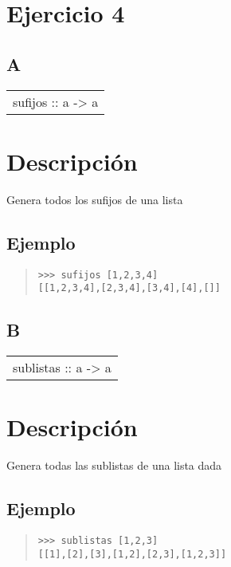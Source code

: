 \section{Ejercicio 4}
\subsection{A}
\begin{haddockdesc}
\item[\begin{tabular}{@{}l}
sufijos :: {\char 91}a{\char 93} -> {\char 91}{\char 91}a{\char 93}{\char 93}
\end{tabular}]
{\haddockbegindoc
\section*{Descripción}
Genera todos los sufijos de una lista\par
\subsection*{Ejemplo}
\begin{quote}
{\haddockverb\begin{verbatim}
>>> sufijos [1,2,3,4]
[[1,2,3,4],[2,3,4],[3,4],[4],[]]

\end{verbatim}}
\end{quote}}
\end{haddockdesc}
\subsection{B}
\begin{haddockdesc}
\item[\begin{tabular}{@{}l}
sublistas :: {\char 91}a{\char 93} -> {\char 91}{\char 91}a{\char 93}{\char 93}
\end{tabular}]
{\haddockbegindoc
\section*{Descripción}
Genera todas las sublistas de una lista dada\par
\subsection*{Ejemplo}
\begin{quote}
{\haddockverb\begin{verbatim}
>>> sublistas [1,2,3]
[[1],[2],[3],[1,2],[2,3],[1,2,3]]

\end{verbatim}}
\end{quote}}
\end{haddockdesc}
